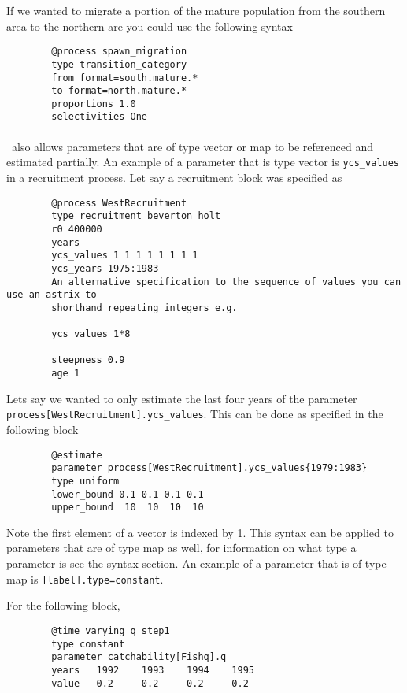 If we wanted to migrate a portion of the mature population from the southern area to the northern are you could use the following syntax

{\small{\begin{verbatim}
		@process spawn_migration
		type transition_category
		from format=south.mature.*
		to format=north.mature.*
		proportions 1.0
		selectivities One
		\end{verbatim}}}


\paragraph*{\label{sec:params}}

\CNAME\ also allows parameters that are of type vector or map to be referenced and estimated partially. An example of a parameter that is type vector is \texttt{ycs\_values} in a recruitment process. Let say a recruitment block was specified as

{\small{\begin{verbatim}
		@process WestRecruitment
		type recruitment_beverton_holt
		r0 400000
		years
		ycs_values 1 1 1 1 1 1 1 1
		ycs_years 1975:1983
		An alternative specification to the sequence of values you can use an astrix to
		shorthand repeating integers e.g.

		ycs_values 1*8

		steepness 0.9
		age 1
		\end{verbatim}}}

Lets say we wanted to only estimate the last four years of the parameter \texttt{process[WestRecruitment].ycs\_values}. This can be done as specified in the following  block

{\small{\begin{verbatim}
		@estimate
		parameter process[WestRecruitment].ycs_values{1979:1983}
		type uniform
		lower_bound 0.1 0.1 0.1 0.1
		upper_bound  10  10  10  10
		\end{verbatim}}}

Note the first element of a vector is indexed by 1. This syntax can be applied to parameters that are of type map as well, for information on what type a parameter is see the syntax section. An example of a parameter that is of type map is \texttt{[label].type=constant}.

For the following  block,

{\small{\begin{verbatim}
		@time_varying q_step1
		type constant
		parameter catchability[Fishq].q
		years 	1992	1993	1994	1995
		value 	0.2		0.2		0.2		0.2
		\end{verbatim}}}

